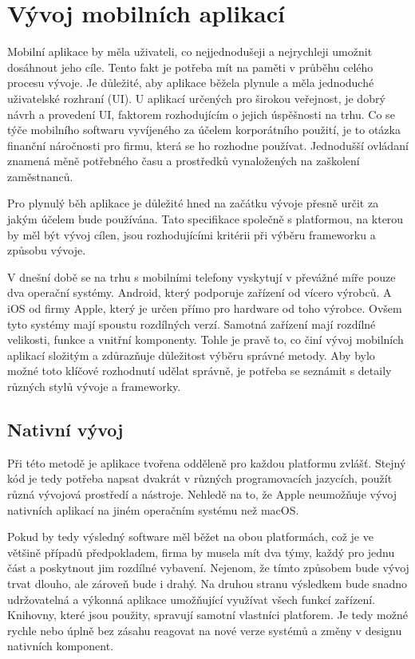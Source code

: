 \documentclass[
  glossaries,
]{kidiplom}
\begin{document}
\section{Vývoj mobilních aplikací}
Mobilní aplikace by měla uživateli, co nejjednodušeji a nejrychleji umožnit dosáhnout jeho cíle. Tento fakt je potřeba mít na paměti v průběhu celého procesu vývoje. Je důležité, aby aplikace běžela plynule a měla jednoduché uživatelské rozhraní (UI). U aplikací určených pro širokou veřejnost, je dobrý návrh a provedení UI, faktorem rozhodujícím o jejich úspěšnosti na trhu. Co se týče mobilního softwaru vyvíjeného za účelem korporátního použití, je to otázka finanční náročnosti pro firmu, která se ho rozhodne používat. Jednodušší ovládaní znamená měně potřebného času a prostředků vynaložených na zaškolení zaměstnanců.

Pro plynulý běh aplikace je důležité hned na začátku vývoje přesně určit
 za jakým účelem bude používána. Tato specifikace společně s platformou, 
 na kterou by měl být vývoj cílen, jsou rozhodujícími kritérii při výběru frameworku a způsobu vývoje.

V dnešní době se na trhu s mobilními telefony vyskytují v převážné míře pouze dva operační systémy. Android, který podporuje zařízení od vícero výrobců. A iOS od firmy Apple, který je určen přímo pro hardware od toho výrobce. Ovšem tyto systémy mají spoustu rozdílných verzí. Samotná zařízení mají rozdílné velikosti, funkce a vnitřní komponenty. Tohle je pravě to, co činí vývoj mobilních aplikací složitým a zdůrazňuje důležitost výběru správné metody. Aby bylo možné toto klíčové rozhodnutí udělat správně, je potřeba se seznámit s detaily různých stylů vývoje a frameworky.

\subsection{Nativní vývoj}
Při této metodě je aplikace tvořena odděleně pro každou platformu zvlášť. Stejný kód je tedy potřeba napsat dvakrát v různých programovacích jazycích, použít různá vývojová prostředí a nástroje. Nehledě na to, že Apple neumožňuje vývoj nativních aplikací na jiném operačním systému než macOS. 

Pokud by tedy výsledný software měl běžet na obou platformách, což je ve většině případů předpokladem, firma by musela mít dva týmy, každý pro jednu část a poskytnout jim rozdílné vybavení. Nejenom, že tímto způsobem bude vývoj trvat dlouho, ale zároveň bude i drahý. Na druhou stranu výsledkem bude snadno udržovatelná a výkonná aplikace umožňující využívat všech funkcí zařízení. Knihovny, které jsou použity, spravují samotní vlastníci platforem. Je tedy možné rychle nebo úplně bez zásahu reagovat na nové verze systémů a změny v designu nativních komponent. 
\end{document}
